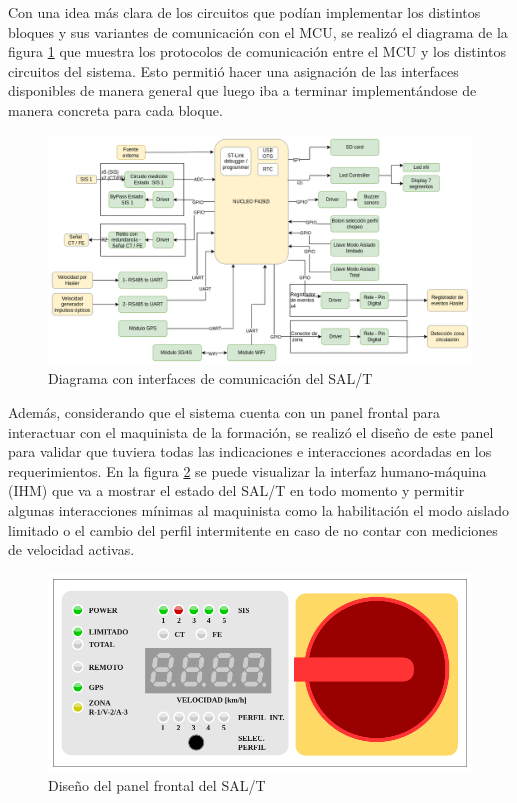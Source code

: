 Con una idea más clara de los circuitos que podían implementar los distintos bloques y sus variantes de comunicación con el MCU, se realizó el diagrama de la figura \ref{fig:diagrama_bloques_coms} que muestra los protocolos de comunicación entre el MCU y los distintos circuitos del sistema. Esto permitió hacer una asignación de las interfaces disponibles de manera general que luego iba a terminar implementándose de manera concreta para cada bloque. 

\begin{figure}[H]
    \centering
    \includegraphics[width =  \linewidth]{img/diagrama_con_coms.png}
    \caption{Diagrama con interfaces de comunicación del SAL/T}
    \label{fig:diagrama_bloques_coms}
\end{figure}


Además, considerando que el sistema cuenta con un panel frontal para interactuar con el maquinista de la formación, se realizó el diseño de este panel para validar que tuviera todas las indicaciones e interacciones acordadas en los requerimientos. En la figura \ref{fig:panel_frontal} se puede visualizar la interfaz humano-máquina (IHM) que va a mostrar el estado del SAL/T en todo momento y permitir algunas interacciones mínimas al maquinista como la habilitación el modo aislado limitado o el cambio del perfil intermitente en caso de no contar con mediciones de velocidad activas. 
 
\begin{figure}[H]
    \centering
    \includegraphics[width =  \linewidth]{img/ihm.png}
    \caption{Diseño del panel frontal del SAL/T}
    \label{fig:panel_frontal}
\end{figure}

